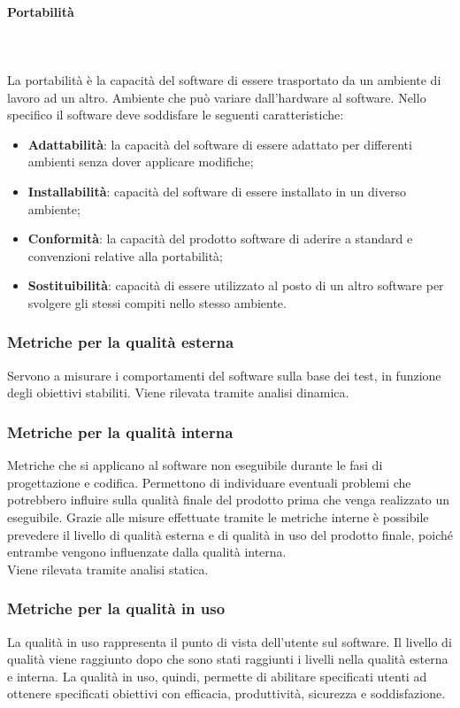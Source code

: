 \paragraph{Portabilità}\mbox{} \\ \mbox{} \\
La portabilità è la capacità del software di essere trasportato da un ambiente di lavoro ad un altro. Ambiente che può variare dall'hardware al software.
Nello specifico il software deve soddisfare le seguenti caratteristiche:
\begin{itemize}
	\item \textbf{Adattabilità}: la capacità del software di essere adattato per differenti ambienti senza dover applicare modifiche;
	\item \textbf{Installabilità}: capacità del software di essere installato in un diverso ambiente;
	\item \textbf{Conformità}: la capacità del prodotto software di aderire a standard e convenzioni relative alla portabilità;
	\item \textbf{Sostituibilità}: capacità di essere utilizzato al posto di un altro software per svolgere gli stessi compiti nello stesso ambiente.
\end{itemize}
\subsubsection{Metriche per la qualità esterna}
Servono a misurare i comportamenti del software sulla base dei test, in funzione degli obiettivi stabiliti. Viene rilevata tramite analisi dinamica\glo.

\subsubsection{Metriche per la qualità interna}
Metriche che si applicano al software non eseguibile durante le fasi di progettazione e codifica. Permettono di individuare eventuali problemi che potrebbero influire sulla qualità finale del prodotto prima che venga realizzato un eseguibile. Grazie alle misure effettuate tramite le metriche interne è possibile prevedere il livello di qualità esterna e di qualità in uso del prodotto finale, poiché entrambe vengono influenzate dalla qualità interna.\\
Viene rilevata tramite analisi statica\glo.

\subsubsection{Metriche per la qualità in uso}
La qualità in uso rappresenta il punto di vista dell'utente sul software. Il livello di qualità viene raggiunto dopo che sono stati raggiunti i livelli nella qualità esterna e interna. La qualità in uso, quindi, permette di abilitare specificati utenti ad ottenere specificati obiettivi con efficacia, produttività, sicurezza e soddisfazione.


